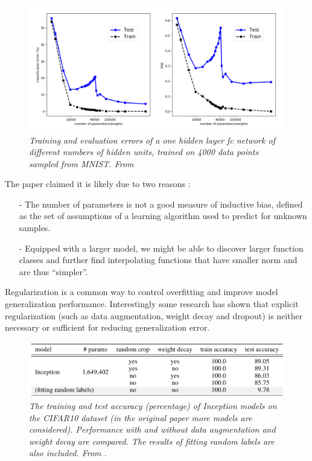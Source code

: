 \documentclass[11pt,a4paper]{article}
\begin{document}
\begin{figure}[H]
 \centering
 \includegraphics[scale=0.4]{../images/new-risk-curve-graph.png}
 \caption{\textit{Training and evaluation errors of a one hidden layer fc network of different numbers of hidden units, trained on 4000 data points sampled from MNIST. From \cite{doubleU}}}  
 \label{mnist-b-v}
\end{figure}

The paper claimed it is likely due to two reasons : 

\begin{itemize}
 \item [-] The number of parameters is not a good measure of inductive bias, defined as the set of assumptions of a learning algorithm used to predict for unknown samples.
 
 \item [-] Equipped with a larger model, we might be able to discover larger function classes and further find interpolating functions that have smaller norm and are thus “simpler”.
\end{itemize}

Regularization is a common way to control overfitting and improve model generalization performance. 
Interestingly some research \cite{rethink} has shown that explicit regularization (such as data augmentation, weight decay and dropout) is neither necessary or sufficient for reducing generalization error.

\begin{figure}[H]
 \centering
 \includegraphics[scale=0.6]{../images/table_regul.png}
 \caption{\textit{The training and test accuracy (percentage) of Inception models on the CIFAR10 dataset (in the original paper more models are considered).
  Performance with and without data augmentation and weight decay are compared. The results of fitting random labels are also included. From \cite{rethink}.}}  
 \label{table}
\end{figure}
\end{document}
